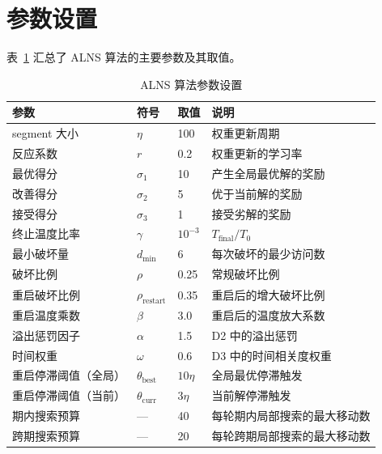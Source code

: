 \documentclass{article}
\begin{document}
\section{参数设置}
\label{sec:alns-parameters}

表~\ref{tab:alns-params} 汇总了 ALNS 算法的主要参数及其取值。

\begin{table}[htbp]
\centering
\caption{ALNS 算法参数设置}
\label{tab:alns-params}
\begin{tabular}{llll}
\toprule
\textbf{参数} & \textbf{符号} & \textbf{取值} & \textbf{说明} \\
\midrule
segment 大小      & $\eta$         & 100   & 权重更新周期 \\
反应系数          & $r$            & 0.2   & 权重更新的学习率 \\
最优得分          & $\sigma_1$     & 10    & 产生全局最优解的奖励 \\
改善得分          & $\sigma_2$     & 5     & 优于当前解的奖励 \\
接受得分          & $\sigma_3$     & 1     & 接受劣解的奖励 \\
终止温度比率      & $\gamma$       & $10^{-3}$ & $T_{\text{final}}/T_0$ \\
最小破坏量        & $d_{\min}$     & 6     & 每次破坏的最少访问数 \\
破坏比例          & $\rho$         & 0.25  & 常规破坏比例 \\
重启破坏比例      & $\rho_{\text{restart}}$ & 0.35 & 重启后的增大破坏比例 \\
重启温度乘数      & $\beta$        & 3.0   & 重启后的温度放大系数 \\
溢出惩罚因子      & $\alpha$       & 1.5   & D2 中的溢出惩罚 \\
时间权重          & $\omega$       & 0.6   & D3 中的时间相关度权重 \\
重启停滞阈值（全局）& $\theta_{\text{best}}$ & $10\eta$ & 全局最优停滞触发 \\
重启停滞阈值（当前）& $\theta_{\text{curr}}$ & $3\eta$  & 当前解停滞触发 \\
期内搜索预算      & ---            & 40    & 每轮期内局部搜索的最大移动数 \\
跨期搜索预算      & ---            & 20    & 每轮跨期局部搜索的最大移动数 \\
\bottomrule
\end{tabular}
\end{table}
\end{document}
